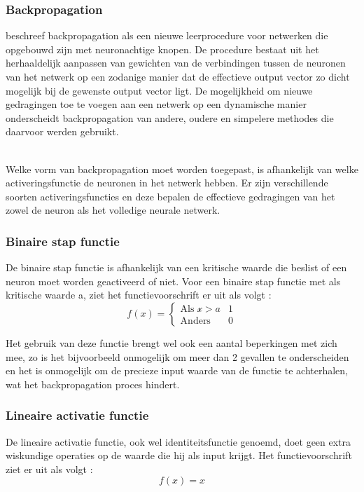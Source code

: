 {\subsubsection{Backpropagation}
\textcite{Rumelhart1986} beschreef backpropagation als een nieuwe leerprocedure voor netwerken die opgebouwd zijn met neuronachtige knopen. De procedure bestaat uit het herhaaldelijk aanpassen van gewichten van de verbindingen tussen de neuronen van het netwerk op een zodanige manier dat de effectieve output vector zo dicht mogelijk bij de gewenste output vector ligt. De mogelijkheid om nieuwe gedragingen toe te voegen aan een netwerk op een dynamische manier onderscheidt backpropagation van andere, oudere en simpelere methodes die daarvoor werden gebruikt. 

\\
\hfill \break
Welke vorm van backpropagation moet worden toegepast, is afhankelijk van welke activeringsfunctie de neuronen in het netwerk hebben. 
Er zijn verschillende soorten activeringsfuncties en deze bepalen de effectieve gedragingen van het zowel de neuron als het volledige neurale netwerk. 
\subsubsection{Binaire stap functie}
De binaire stap functie is afhankelijk van een kritische waarde die beslist of een neuron moet worden geactiveerd of niet. Voor een binaire stap functie met als kritische waarde a, ziet het functievoorschrift er uit als volgt : 
\[f(x) =  \left\{ \begin{matrix}\mbox{Als } \mathcal{x} > a & 1 \\ \mbox{Anders } & 0 \end{matrix}\right.\] 

Het gebruik van deze functie brengt wel ook een aantal beperkingen met zich mee, zo is het bijvoorbeeld onmogelijk om meer dan 2 gevallen te onderscheiden en het is onmogelijk om de precieze input waarde van de functie te achterhalen, wat het backpropagation proces hindert.

\subsubsection{Lineaire activatie functie} 
De lineaire activatie functie, ook wel identiteitsfunctie genoemd, doet geen extra wiskundige operaties op de waarde die hij als input krijgt. Het functievoorschrift ziet er uit als volgt : 
\[f(x) =  x\]

}

